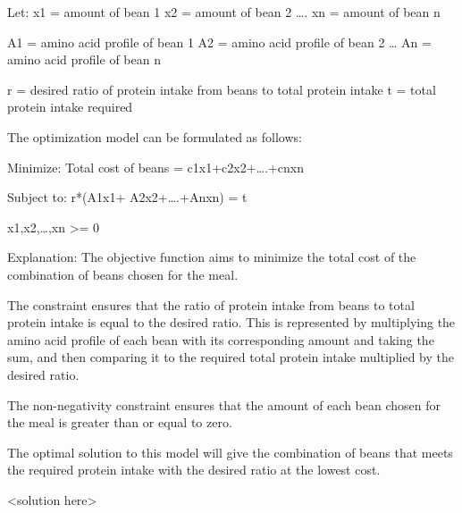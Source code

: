 \question Let:
x1 = amount of bean 1
x2 = amount of bean 2
….
xn = amount of bean n

A1 = amino acid profile of bean 1
A2 = amino acid profile of bean 2
…
An = amino acid profile of bean n

r = desired ratio of protein intake from beans to total protein intake
t = total protein intake required

The optimization model can be formulated as follows:

Minimize:
Total cost of beans = c1x1+c2x2+….+cnxn

Subject to:
r*(A1x1+ A2x2+….+Anxn) = t

x1,x2,…,xn >= 0

Explanation:
The objective function aims to minimize the total cost of the combination of beans chosen for the meal.

The constraint ensures that the ratio of protein intake from beans to total protein intake is equal to the desired ratio. This is represented by multiplying the amino acid profile of each bean with its corresponding amount and taking the sum, and then comparing it to the required total protein intake multiplied by the desired ratio.

The non-negativity constraint ensures that the amount of each bean chosen for the meal is greater than or equal to zero.

The optimal solution to this model will give the combination of beans that meets the required protein intake with the desired ratio at the lowest cost.
\begin{solution}
<solution here>
\end{solution}
